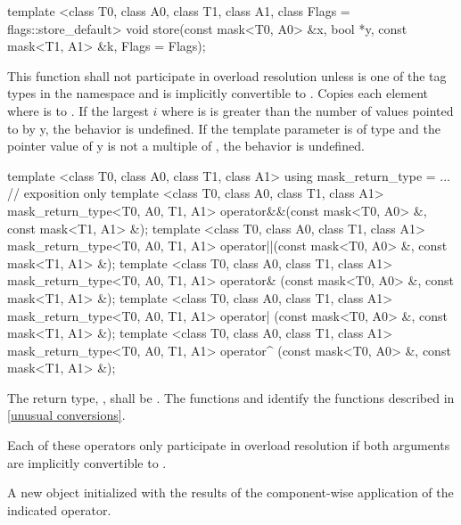 \begin{itemdecl}
template <class T0, class A0, class T1, class A1, class Flags = flags::store_default>
void store(const mask<T0, A0> &x, bool *y, const mask<T1, A1> &k, Flags = Flags{});
\end{itemdecl}
\begin{itemdescr}
  \pnum\remarks This function shall not participate in overload resolution unless  is one of the tag types in the  namespace and \mask[<T1, A1>] is implicitly convertible to \mask[<T0, A0>].
  \pnum\effects Copies each element  where  is \true to  \foralli.
  \pnum\remarks If the largest $i$ where  is \true is greater than the number of values pointed to by \code y, the behavior is undefined.
  \pnum\remarks If the  template parameter is of type  and the pointer value of \code y is not a multiple of , the behavior is undefined.
\end{itemdescr}

\begin{itemdecl}
template <class T0, class A0, class T1, class A1> using mask_return_type = ...  // exposition only
template <class T0, class A0, class T1, class A1>
mask_return_type<T0, A0, T1, A1> operator&&(const mask<T0, A0> &, const mask<T1, A1> &);
template <class T0, class A0, class T1, class A1>
mask_return_type<T0, A0, T1, A1> operator||(const mask<T0, A0> &, const mask<T1, A1> &);
template <class T0, class A0, class T1, class A1>
mask_return_type<T0, A0, T1, A1> operator& (const mask<T0, A0> &, const mask<T1, A1> &);
template <class T0, class A0, class T1, class A1>
mask_return_type<T0, A0, T1, A1> operator| (const mask<T0, A0> &, const mask<T1, A1> &);
template <class T0, class A0, class T1, class A1>
mask_return_type<T0, A0, T1, A1> operator^ (const mask<T0, A0> &, const mask<T1, A1> &);
\end{itemdecl}
\begin{itemdescr}
  \newcommand\maskreturntype{\xspace}
  \pnum\remarks The return type, \maskreturntype, shall be .
    The functions  and  identify the functions described in \ref{unusual conversions}.

  \pnum\remarks Each of these operators only participate in overload resolution if both arguments are implicitly convertible to \maskreturntype.

  \pnum\returns A new \mask object initialized with the results of the component-wise application of the indicated operator.
\end{itemdescr}


